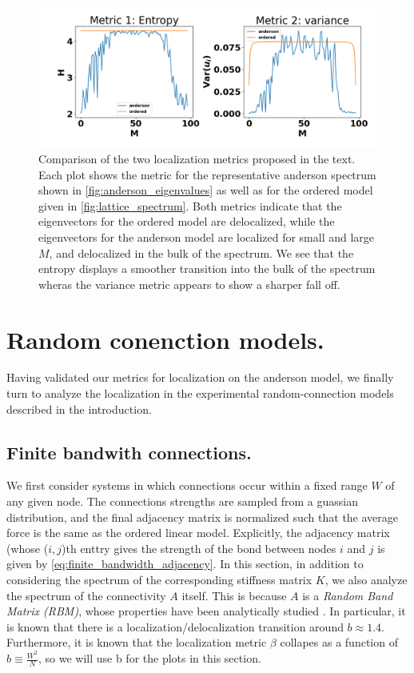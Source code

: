 \documentclass{article}
\begin{document}
\begin{figure}
	\begin{center}
\includegraphics[width=\textwidth]{Figures/localization_metric_demo.png}
\end{center}
\caption{
	Comparison of the two localization metrics proposed in the text.
Each plot shows the metric for the representative anderson spectrum shown in \ref{fig:anderson_eigenvalues} as well as 
	for the ordered model given in \ref{fig:lattice_spectrum}. 
	Both metrics indicate that the eigenvectors for the ordered model are delocalized, while the
	eigenvectors for the anderson model are localized for small and large $M$, and delocalized 
	in the bulk of the spectrum.
	We see that the entropy displays a smoother transition into the bulk of the spectrum wheras 
	the variance metric appears to show a sharper fall off.
}
\label{fig:anderson_localization}
\end{figure}


\section{Random conenction models.}

Having validated our metrics for localization on the anderson model, we finally turn to analyze the localization in the experimental random-connection models described in the introduction.

\subsection{Finite bandwith connections.}

We first consider systems in which connections occur within a fixed range $W$ of any given node.
The connections strengths are sampled from a guassian distribution, and the final adjacency matrix is normalized such that the average force
is the same as the ordered linear model.
Explicitly, the adjacency matrix (whose ($i, j$)th enttry gives the strength of the bond between nodes $i$ and $j$ is given by \ref{eq:finite_bandwidth_adjacency}.
In this section, in addition to considering the spectrum of the corresponding stiffness matrix $K$, we also analyze the spectrum of the connectivity $A$ itself.
This is because $A$ is a \textit{Random Band Matrix (RBM)}, whose properties have been analytically studied \cite{Bourgade2018-qz}.
In particular, it is known that there is a localization/delocalization transition around $b \approx 1.4$\cite{Casati1990-ma}. 
Furthermore, it is known that the localization metric $\beta$ collapes as a function of $b\equiv \frac{W^2}{N}$, so we will use b for the plots in this section.
\end{document}
